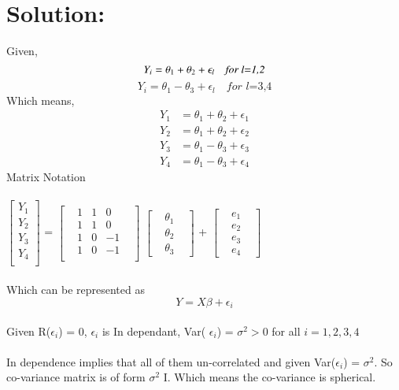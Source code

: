 \documentclass{article}
\begin{document}
\section{Solution:} 
Given,
\begin{equation}
    Y_i = \theta_1 + \theta_2 + \epsilon_l \quad \textit{for l=1,2} \\
\end{equation}
\begin{equation}
    Y_i = \theta_1 - \theta_3 + \epsilon_l \quad \textit{for l=3,4}
\end{equation}
Which means,
\begin{align*}
     Y_1 &= \theta_1 + \theta_2 + \epsilon_1 \\ 
     Y_2 &= \theta_1 + \theta_2 + \epsilon_2 \\
     Y_3 &= \theta_1 - \theta_3 + \epsilon_3 \\
     Y_4 &= \theta_1 - \theta_3 + \epsilon_4 
\end{align*}
Matrix Notation\\
\\
$\begin{bmatrix}
    Y_1\\
    Y_2\\
    Y_3\\
    Y_4\\
\end{bmatrix}$ = 
$\begin{bmatrix}
    &1&   1&   0&\\
    &1&   1&   0&\\
    &1&   0&  -1&\\
    &1&   0&  -1&\\
\end{bmatrix}$ 
$\begin{bmatrix}
    &\theta_1&\\
    &\theta_2&\\
    &\theta_3&
\end{bmatrix}$ + 
$\begin{bmatrix}
    &e_1& \\
    &e_2& \\
    &e_3& \\
    &e_4&
\end{bmatrix}$ \\
\\
Which can be represented as 
\begin{equation*}
    Y = X \beta + \epsilon_i
\end{equation*}
\\
Given R($\epsilon_i$) = 0, $\epsilon_i$ is In dependant, Var( $\epsilon_i$) = $\sigma^2 > 0$ for all $i = 1,2,3,4$\\
\\
In dependence implies that all of them un-correlated and given Var($\epsilon_i$) = $\sigma^2$. So co-variance matrix is of form $\sigma^2$ I. Which means the co-variance is spherical.
\end{document}
